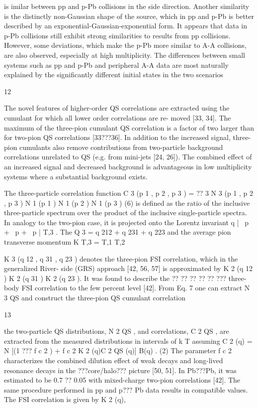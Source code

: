 is imilar between pp and p-Pb collisions in the side direction.
Another similarity is the distinctly non-Gaussian shape of
the source, which in pp and p-Pb is better described by an
exponential-Gaussian-exponential form. It appears that data
in p-Pb collisions still exhibit strong similarities to results
from pp collisions. However, some deviations, which make
the p-Pb more similar to A-A collisions, are also observed,
especially at high multiplicity. The differences between small
systems such as pp and p-Pb and peripheral A-A data are most
naturally explained by the significantly different initial states
in the two scenarios

12

The novel features of higher-order
QS correlations are extracted using the cumulant for which all lower order correlations are re-
moved [33, 34]. The maximum of the three-pion cumulant QS correlation is a factor of two
larger than for two-pion QS correlations [33???36]. In addition to the increased signal, three-pion
cumulants also remove contributions from two-particle background correlations unrelated to
QS (e.g. from mini-jets [24, 26]). The combined effect of an increased signal and decreased
background is advantageous in low multiplicity systems where a substantial background exists.

The three-particle correlation function
C 3 (p 1 , p 2 , p 3 ) = ?? 3
N 3 (p 1 , p 2 , p 3 )
N 1 (p 1 ) N 1 (p 2 ) N 1 (p 3 )
(6)
is defined as the ratio of the inclusive three-particle spectrum over the product of the inclusive
single-particle
spectra. In analogy to the two-pion case, it is projected onto the Lorentz invariant
q
|~ p
+~ p
+~ p
|
T,3
. The
Q 3 = q 212 + q 231 + q 223 and the average pion transverse momentum K T,3 = T,1 T,2

K 3 (q 12 , q 31 , q 23 ) denotes the three-pion FSI correlation, which in the generalized River-
side (GRS) approach [42, 56, 57] is approximated by K 2 (q 12 ) K 2 (q 31 ) K 2 (q 23 ). It was found to
describe the ?? ?? ?? ?? ?? ??? three-body FSI correlation to the few percent level [42]. From Eq. 7 one
can extract N 3 QS and construct the three-pion QS cumulant correlation

13

the two-particle QS distributions, N 2 QS , and correlations, C 2 QS , are extracted
from the measured distributions in intervals of k T assuming
C 2 (q) = N [(1 ??? f c 2 ) + f c 2 K 2 (q)C 2 QS (q)] B(q) .
(2)
The parameter f c 2 characterizes the combined dilution effect of weak decays and long-lived
resonance decays in the ???core/halo??? picture [50, 51]. In Pb???Pb, it was estimated to be 0.7 ?? 0.05
with mixed-charge two-pion correlations [42]. The same procedure performed in pp and p???
Pb data results in compatible values. The FSI correlation is given by K 2 (q),

